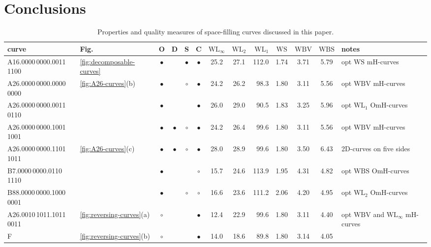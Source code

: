 \documentclass[11pt,a4paper]{article}
\def\WLMax{\ensuremath{\mathrm{WL}_\infty}\xspace}
\def\WLEuc{\ensuremath{\mathrm{WL}_2}\xspace}
\def\WLMan{\ensuremath{\mathrm{WL}_1}\xspace}
\def\WS{\ensuremath{\mathrm{WS}}\xspace}
\def\WBV{\ensuremath{\mathrm{WBV}}\xspace}
\def\WBS{\ensuremath{\mathrm{WBS}}\xspace}
\begin{document}
\section{Conclusions}

\begin{sidewaystable}\label{tab:results}
\caption{Properties and quality measures of space-filling curves discussed in this paper.}
\def\no{}
\def\half{\ensuremath{\circ}}
\def\yes{\ensuremath{\bullet}}

\addvspace\baselineskip
\def\arraystretch{1.25}
\begin{tabularx}{\hsize}{ll|@{\,}c@{\,}c@{\,}c@{\,}c@{\,}|@{ }c@{ }c@{ }r@{ }|@{\,}c@{\,}|@{\,}c@{\,}c@{\,}|X}
curve      &Fig.&O&D&S&C& \WLMax     & \WLEuc & \WLMan & \WS & \WBV & \WBS &
notes \\
\hline
A16.0000\,0000.0011\,1100 & \ref{fig:decomposable-curves} & \yes  &       & \yes  & \yes  & 25.2 & 27.1   & 112.0  & 1.74 & 3.71 & 5.79 &
opt \WS mH-curves
\\
A26.0000\,0000.0000\,0000 & \ref{fig:A26-curves}(b)       & \yes  & \no   & \half & \yes  & 24.2 & 26.2   & 98.3   & 1.80 & 3.11 & 5.56 &
opt \WBV mH-curves
\\
A26.0000\,0000.0011\,0110 &                               & \yes  & \no   & \no   & \yes  & 26.0 & 29.0   &  90.5  & 1.83 & 3.25 & 5.96 &
opt \WLMan OmH-curves
\\
A26.0000\,0000.1001\,1001 &                               & \yes  & \yes  & \half & \yes  & 24.2 & 26.4   &  99.6  & 1.80 & 3.11 & 5.56 &
opt \WBV mH-curves
\\
A26.0000\,0000.1101\,1011 & \ref{fig:A26-curves}(c)       & \yes  & \yes  & \half & \yes  & 28.0 & 28.9   & 99.6   & 1.80 & 3.50 & 6.43 &
2D-curves on five sides
\\
B\hphantom{0}7.0000\,0000.0110\,1110  &
                                                          & \yes  & \no   & \no   & \half & 15.7 & 24.6   & 113.9  & 1.95 & 4.31 & 4.82 &
opt \WBS OmH-curves
\\
B88.0000\,0000.1000\,0001 &
                                                          & \yes  & \no   & \half & \half & 16.6 & 23.6   & 111.2  & 2.06 & 4.20 & 4.95 &
opt \WLEuc OmH-curves
\\\hline
A26.0010\,1011.1011\,0011 & \ref{fig:reversing-curves}(a) & \half & \no   & \no   & \yes  & 12.4 & 22.9   &  99.6  & 1.80 & 3.11 & 4.40 &
opt \WBV and \WLMax mH-curves
\\
F          & \ref{fig:reversing-curves}(b)                & \half & \no   & \no   & \yes  & 14.0 & 18.6   & 89.8   & 1.80 & 3.14 & 4.05 &

\end{tabularx}
\end{sidewaystable}
\end{document}
